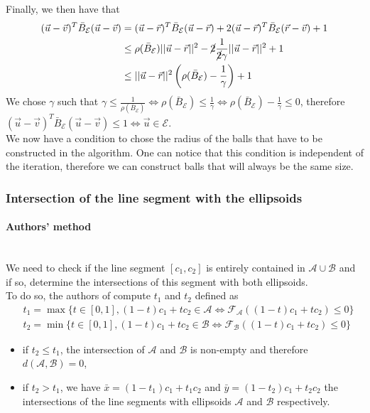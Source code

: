 \documentclass[class=report, float=false, crop=false]{standalone}
\begin{document}
Finally, we then have that
\begin{align*}
(\vec{u} - \vec{v})^T\bar{B}_{\mathcal{E}}(\vec{u} - \vec{v}) &= (\vec{u} - \vec{r})^T\bar{B}_{\mathcal{E}}(\vec{u} - \vec{r}) + 2(\vec{u} - \vec{r})^T\bar{B}_{\mathcal{E}}(\vec{r} - \vec{v}) + 1\\
&\leq \rho(\bar{B}_{\mathcal{E}}) ||\vec{u}-\vec{r}||^2 - \cancel{2}\frac{1}{\cancel{2}\gamma}||\vec{u}-\vec{r}||^2 + 1\\
&\leq ||\vec{u} - \vec{r}||^2\left(\rho(\bar{B}_{\mathcal{E}}) - \frac{1}{\gamma}\right) + 1
\end{align*}
We chose $\gamma$ such that $\gamma \leq \frac{1}{\rho(\bar{B}_{\mathcal{E}})} \Leftrightarrow \rho(\bar{B}_{\mathcal{E}}) \leq \frac{1}{\gamma} \Leftrightarrow \rho(\bar{B}_{\mathcal{E}}) - \frac{1}{\gamma} \leq 0$, therefore $(\vec{u} - \vec{v})^T\bar{B}_{\mathcal{E}}(\vec{u} - \vec{v}) \leq 1 \Leftrightarrow \vec{u} \in \mathcal{E}$.\\

We now have a condition to chose the radius of the balls that have to be constructed in the algorithm. One can notice that this condition is independent of the iteration, therefore we can construct balls that will always be the same size.

\subsubsection{Intersection of the line segment with the ellipsoids}

\paragraph{Authors' method}\mbox{}\\

We need to check if the line segment $[c_1,c_2]$ is entirely contained in $\mathcal{A} \cup \mathcal{B}$ and if so, determine the intersections of this segment with both ellipsoids.\\

To do so, the authors of \cite{lin2002distance} compute $t_1$ and $t_2$ defined as
\begin{equation}
\begin{aligned}
&t_1 = \max\{t \in [0,1], (1-t)c_1 + tc_2 \in \mathcal{A} \Leftrightarrow \mathcal{F}_{\mathcal{A}}((1-t)c_1 + tc_2) \leq 0\}\\
&t_2 = \min\{t \in [0,1], (1-t)c_1 + tc_2 \in \mathcal{B} \Leftrightarrow \mathcal{F}_{\mathcal{B}}((1-t)c_1 + tc_2) \leq 0\}
\end{aligned}
\label{t1_t2}
\end{equation}
\begin{itemize}
\item if $t_2 \leq t_1$, the intersection of $\mathcal{A}$ and $\mathcal{B}$ is non-empty and therefore $d(\mathcal{A},\mathcal{B}) = 0$,
\item if $t_2 > t_1$, we have $\bar{x} = (1 - t_1)c_1 + t_1c_2$ and $\bar{y} = (1 - t_2)c_1 + t_2c_2$ the intersections of the line segments with ellipsoids $\mathcal{A}$ and $\mathcal{B}$ respectively.
\end{itemize}
\end{document}
